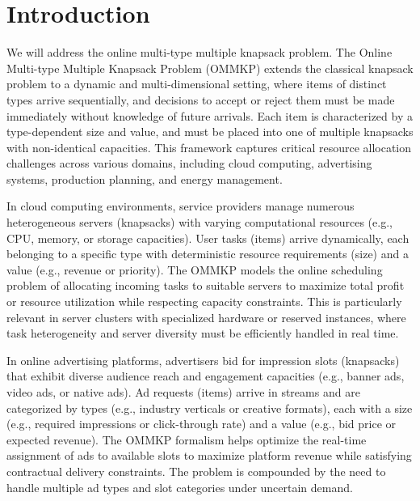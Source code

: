 


\section{Introduction}
We will address the online multi-type multiple knapsack problem. 
The Online Multi-type Multiple Knapsack Problem (OMMKP) extends the classical knapsack problem to a dynamic and multi-dimensional setting, where items of distinct types arrive sequentially, and decisions to accept or reject them must be made immediately without knowledge of future arrivals. Each item is characterized by a type-dependent size and value, and must be placed into one of multiple knapsacks with non-identical capacities. This framework captures critical resource allocation challenges across various domains, including cloud computing, advertising systems, production planning, and energy management.


In cloud computing environments, service providers manage numerous heterogeneous servers (knapsacks) with varying computational resources (e.g., CPU, memory, or storage capacities). User tasks (items) arrive dynamically, each belonging to a specific type with deterministic resource requirements (size) and a value (e.g., revenue or priority). The OMMKP models the online scheduling problem of allocating incoming tasks to suitable servers to maximize total profit or resource utilization while respecting capacity constraints. This is particularly relevant in server clusters with specialized hardware or reserved instances, where task heterogeneity and server diversity must be efficiently handled in real time.


In online advertising platforms, advertisers bid for impression slots (knapsacks) that exhibit diverse audience reach and engagement capacities (e.g., banner ads, video ads, or native ads). Ad requests (items) arrive in streams and are categorized by types (e.g., industry verticals or creative formats), each with a size (e.g., required impressions or click-through rate) and a value (e.g., bid price or expected revenue). The OMMKP formalism helps optimize the real-time assignment of ads to available slots to maximize platform revenue while satisfying contractual delivery constraints. The problem is compounded by the need to handle multiple ad types and slot categories under uncertain demand.


